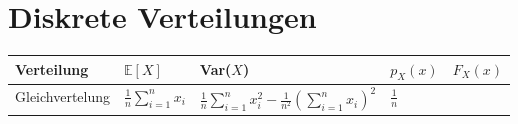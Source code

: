\section{Diskrete Verteilungen}

\begin{tabularx}{\linewidth}{||*{5}{X|}|}
	\hline
	Verteilung & $\mathbb{E}[X]$ & Var($X$) & $p_X(x)$ & $F_X(x)$ \\
	\hline
	\small Gleichvertelung & $\frac{1}{n}\sum_{i=1}^{n}x_i$ & $\frac{1}{n}\sum_{i=1}^{n}x_i^2 -
	\frac{1}{n^2}\left(\sum_{i=1}^n x_i \right)^2$ & $\frac{1}{n}$ &
\end{tabularx}

